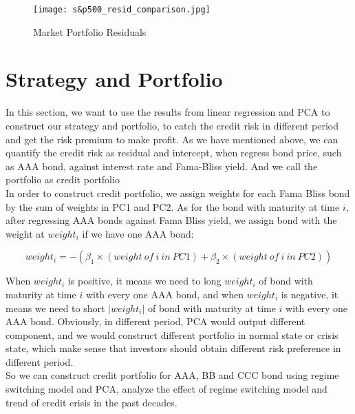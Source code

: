 \documentclass[12pt]{article}
\begin{document}
\begin{figure}[H]
\centering
\texttt{[image: s\&p500\_resid\_comparison.jpg]}\\
\caption{Market Portfolio Residuals}
\end{figure}





\pagestyle{fancyplain}
\cfoot{}

\section{Strategy and Portfolio}

In this section, we want to use the results from linear regression and PCA to construct our strategy and portfolio, to catch the credit risk in different period and get the risk premium to make profit. As we have mentioned above, we can quantify the credit risk as residual and intercept, when regress bond price, such as AAA bond, against interest rate and Fama-Bliss yield. And we call the portfolio as credit portfolio \\

In order to construct credit portfolio, we assign weights for each Fama Bliss bond by the sum of weights in PC1 and PC2. As for the bond with maturity at time $i$, after regressing AAA bonds against Fama Bliss yield, we assign bond with the weight at $weight_i$ if we have one AAA bond:

$$
weight_i = -(\beta_1\times(weight\ of\ i\ in\ PC1) + \beta_2\times(weight\ of\ i\ in\ PC2))
$$

When $weight_i$ is positive, it means we need to long $weight_i$ of bond with maturity at time $i$ with every one AAA bond, and when $weight_i$ is negative, it means we need to short $|weight_i|$ of bond with maturity at time $i$ with every one AAA bond. Obviously, in different period, PCA would output different component, and we would construct different portfolio in normal state or crisis state, which make sense that investors should obtain different risk preference in different period.\\

So we can construct credit portfolio for AAA, BB and CCC bond using regime switching model and PCA, analyze the effect of regime switching model and trend of credit crisis in the past decades.
\end{document}
